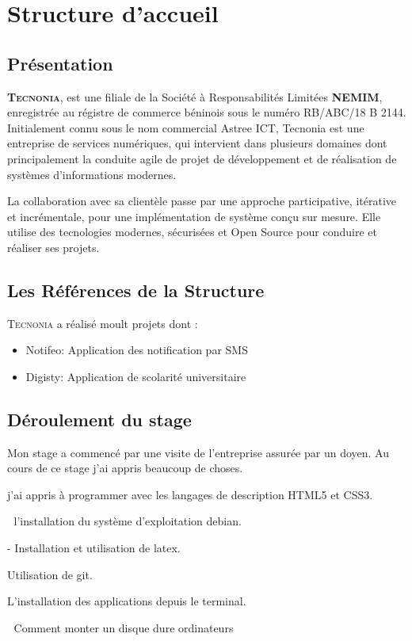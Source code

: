 
\chapter{Structure d'accueil} %

\section{Présentation}
\textbf{\textsc{Tecnonia}}, est une  filiale de la Société à Responsabilités Limitées \textbf{NEMIM}, enregistrée au régistre de commerce béninois sous le numéro RB/ABC/18 B 2144. Initialement connu sous le nom commercial Astree ICT, Tecnonia est une entreprise de services numériques, qui intervient dans plusieurs domaines dont principalement la conduite agile de projet de développement et de réalisation de systèmes d'informations modernes.

La collaboration avec sa clientèle passe par une approche participative, itérative et incrémentale, pour une implémentation de système conçu sur mesure.  Elle utilise des tecnologies modernes, sécurisées et Open Source pour conduire  et réaliser ses projets.

\section{Les Références de la Structure}
\textsc{Tecnonia} a réalisé moult projets dont :

\begin{itemize}
	\item Notifeo: Application des notification par SMS
	\item Digisty: Application de scolarité universitaire
\end{itemize}

\section{Déroulement du stage}
Mon stage a commencé par une visite de l’entreprise assurée par un doyen. Au cours de ce stage j'ai appris beaucoup de choses. 

j'ai appris à programmer avec les langages de description HTML5 et CSS3.

 l’installation du système d’exploitation debian.

- Installation et utilisation de latex.

Utilisation de git.

L'installation des applications depuis le terminal.

 Comment monter un disque dure ordinateurs 
